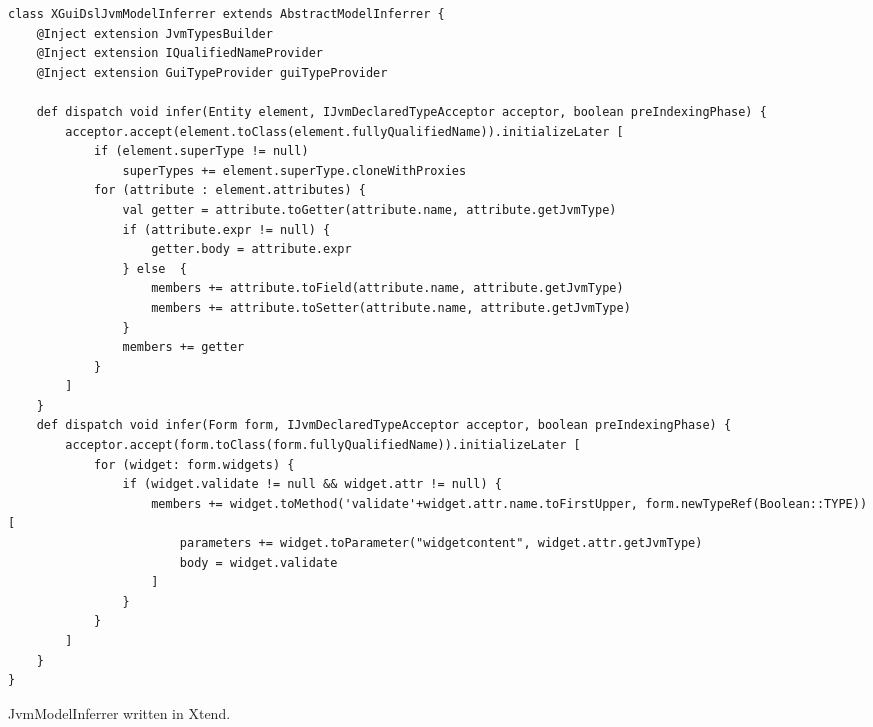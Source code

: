 
\begin{listing}[tb]
\begin{lstlisting}[language=xtend] 
class XGuiDslJvmModelInferrer extends AbstractModelInferrer {
	@Inject extension JvmTypesBuilder
	@Inject extension IQualifiedNameProvider
	@Inject extension GuiTypeProvider guiTypeProvider

	def dispatch void infer(Entity element, IJvmDeclaredTypeAcceptor acceptor, boolean preIndexingPhase) {
		acceptor.accept(element.toClass(element.fullyQualifiedName)).initializeLater [
			if (element.superType != null)
				superTypes += element.superType.cloneWithProxies
			for (attribute : element.attributes) {
				val getter = attribute.toGetter(attribute.name, attribute.getJvmType)
				if (attribute.expr != null) {
					getter.body = attribute.expr
				} else  {
					members += attribute.toField(attribute.name, attribute.getJvmType)
					members += attribute.toSetter(attribute.name, attribute.getJvmType)
				}
				members += getter
			}
		]
	}
	def dispatch void infer(Form form, IJvmDeclaredTypeAcceptor acceptor, boolean preIndexingPhase) { 
		acceptor.accept(form.toClass(form.fullyQualifiedName)).initializeLater [
			for (widget: form.widgets) {
		    	if (widget.validate != null && widget.attr != null) {
		    		members += widget.toMethod('validate'+widget.attr.name.toFirstUpper, form.newTypeRef(Boolean::TYPE)) [
		    			parameters += widget.toParameter("widgetcontent", widget.attr.getJvmType)
		    			body = widget.validate
		    		]
		    	}
		    }   		 	
   		]
   	}
}
\end{lstlisting}
\caption{JvmModelInferrer written in Xtend.}
\label{lst:xbase-jvm-inferrer}
\end{listing}

